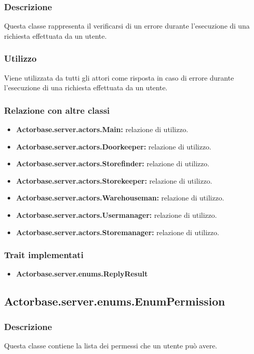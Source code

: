 \documentclass[a4paper]{article}
\begin{document}
			\subsubsection{Descrizione}
				Questa classe rappresenta il verificarsi di un errore durante l'esecuzione di una richiesta effettuata da un utente.
				
			\subsubsection{Utilizzo}
				Viene utilizzata da tutti gli attori come risposta in caso di errore durante l'esecuzione di una richiesta effettuata da un utente.
				
			\subsubsection{Relazione con altre classi}
				\begin{itemize}
					\item \textbf{Actorbase.server.actors.Main:} relazione di utilizzo.
					\item \textbf{Actorbase.server.actors.Doorkeeper:} relazione di utilizzo.
					\item \textbf{Actorbase.server.actors.Storefinder:} relazione di utilizzo.
					\item \textbf{Actorbase.server.actors.Storekeeper:} relazione di utilizzo.
					\item \textbf{Actorbase.server.actors.Warehouseman:} relazione di utilizzo.
					\item \textbf{Actorbase.server.actors.Usermanager:} relazione di utilizzo.
					\item \textbf{Actorbase.server.actors.Storemanager:} relazione di utilizzo.
				\end{itemize}
				
			\subsubsection{Trait implementati}
				\begin{itemize}
					\item \textbf{Actorbase.server.enums.ReplyResult} 
				\end{itemize}
		
		\subsection{Actorbase.server.enums.EnumPermission}
			\subsubsection{Descrizione}
				Questa classe contiene la lista dei permessi che un utente può avere.
				
\end{document}
